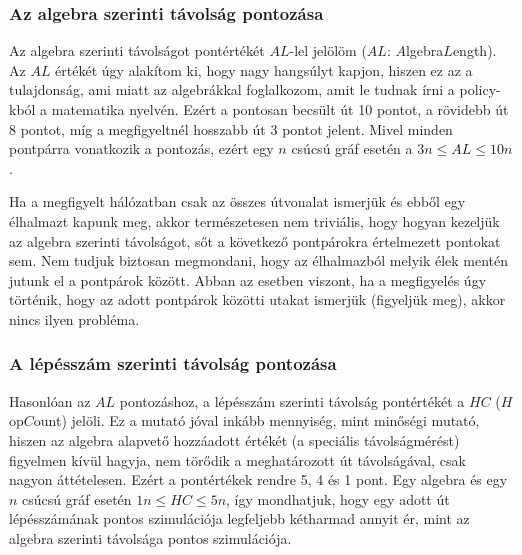     \subsubsection{Az algebra szerinti távolság pontozása}
    Az algebra szerinti távolságot pontértékét $AL$-lel jelölöm ($AL$: $A$lgebra$L$ength). Az $AL$ értékét úgy alakítom ki, hogy nagy hangsúlyt kapjon, hiszen ez az a tulajdonság, ami miatt az algebrákkal foglalkozom, amit le tudnak írni a policy-kból a matematika nyelvén. Ezért a pontosan becsült út 10 pontot, a rövidebb út 8 pontot, míg a megfigyeltnél hosszabb út 3 pontot jelent. Mivel minden pontpárra vonatkozik a pontozás, ezért egy $n$ csúcsú gráf esetén a $3n \leq AL \leq 10n$.

    \begin{note}
      Ha a megfigyelt hálózatban csak az összes útvonalat ismerjük és ebből egy élhalmazt kapunk meg, akkor természetesen nem triviális, hogy hogyan kezeljük az algebra szerinti távolságot, sőt a következő pontpárokra értelmezett pontokat sem. Nem tudjuk biztosan megmondani, hogy az élhalmazból melyik élek mentén jutunk el a pontpárok között. Abban az esetben viszont, ha a megfigyelés úgy történik, hogy az adott pontpárok közötti utakat ismerjük (figyeljük meg), akkor nincs ilyen probléma.
    \end{note}

    \subsubsection{A lépésszám szerinti távolság pontozása}
    Hasonlóan az $AL$ pontozáshoz, a lépésszám szerinti távolság pontértékét a $HC$ ($H$op$C$ount) jelöli. Ez a mutató jóval inkább mennyiség, mint minőségi mutató, hiszen az algebra alapvető hozzáadott értékét (a speciális távolságmérést) figyelmen kívül hagyja, nem törődik a meghatározott út távolságával, csak nagyon áttételesen. Ezért a pontértékek rendre 5, 4 és 1 pont. Egy algebra és egy $n$ csúcsú gráf esetén $1n \leq HC \leq 5n$, így mondhatjuk, hogy egy adott út lépésszámának pontos szimulációja legfeljebb kétharmad annyit ér, mint az algebra szerinti távolsága pontos szimulációja.

